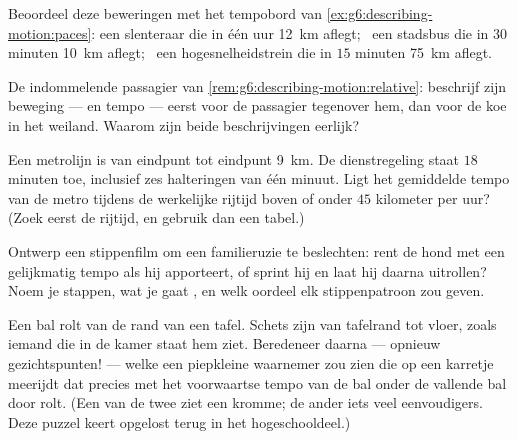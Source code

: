 \begin{exercise}[$\star$]\label{exo:g6:describing-motion:8}
Beoordeel deze beweringen met het tempobord van
\cref{ex:g6:describing-motion:paces}: een slenteraar die in één uur
\qty{12}{km} aflegt; \ een stadsbus die in $30$ minuten \qty{10}{km}
aflegt; \ een hogesnelheidstrein die in $15$ minuten \qty{75}{km}
aflegt.
\end{exercise}

\begin{exercise}[$\star\star$]\label{exo:g6:describing-motion:9}
De indommelende passagier van
\cref{rem:g6:describing-motion:relative}: beschrijf zijn beweging ---
 en tempo --- eerst voor de passagier tegenover hem, dan voor
de koe in het weiland. Waarom zijn beide beschrijvingen eerlijk?
\end{exercise}

\begin{exercise}[$\star\star$]\label{exo:g6:describing-motion:10}
Een metrolijn is van eindpunt tot eindpunt \qty{9}{km}. De dienstregeling
staat $18$ minuten toe, inclusief zes halteringen van één minuut.
Ligt het gemiddelde tempo van de metro tijdens de werkelijke rijtijd
boven of onder $45$ kilometer per uur? (Zoek eerst de rijtijd, en
gebruik dan een tabel.)
\end{exercise}

\begin{exercise}[$\star\star$]\label{exo:g6:describing-motion:11}
Ontwerp een stippenfilm om een familieruzie te beslechten: rent de
hond met een gelijkmatig tempo als hij apporteert, of sprint hij en
laat hij daarna uitrollen? Noem je stappen, wat je gaat , en welk
oordeel elk stippenpatroon zou geven.
\end{exercise}

\begin{exercise}[$\star\star\star$]\label{exo:g6:describing-motion:12}
Een bal rolt van de rand van een tafel. Schets zijn  van
tafelrand tot vloer, zoals iemand die in de kamer staat hem ziet.
Beredeneer daarna --- opnieuw gezichtspunten! --- welke  een
piepkleine waarnemer zou zien die op een karretje meerijdt dat precies
met het voorwaartse tempo van de bal onder de vallende bal door rolt.
(Een van de twee ziet een kromme; de ander iets veel eenvoudigers.
Deze puzzel keert opgelost terug in het hogeschooldeel.)
\end{exercise}

